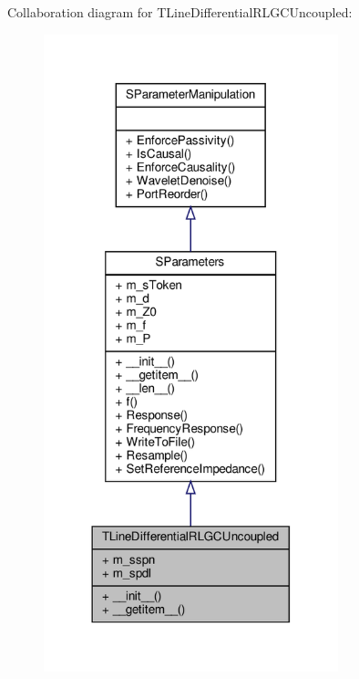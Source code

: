 Collaboration diagram for T\+Line\+Differential\+R\+L\+G\+C\+Uncoupled\+:\nopagebreak
\begin{figure}[H]
\begin{center}
\leavevmode
\includegraphics[width=242pt]{classSignalIntegrity_1_1SParameters_1_1Devices_1_1TLineDifferentialRLGCUncoupled_1_1TLineDifferentialRLGCUncoupled__coll__graph}
\end{center}
\end{figure}
